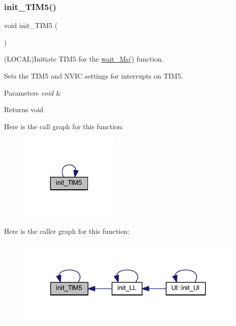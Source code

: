 \subsubsection{\texorpdfstring{init\+\_\+\+T\+I\+M5()}{init\_TIM5()}}
{\footnotesize\ttfamily void init\+\_\+\+T\+I\+M5 (\begin{DoxyParamCaption}\item[{void}]{ }\end{DoxyParamCaption})}



(L\+O\+C\+AL)Initiate T\+I\+M5 for the \mbox{\hyperlink{namespace_l_l_ab30bdedb41438098df71bea7d5eb624d}{wait\+\_\+\+Ms()}} function. 

Sets the T\+I\+M5 and N\+V\+IC settings for interrupts on T\+I\+M5.


\begin{DoxyParams}{Parameters}
{\em void} & \\
\hline
\end{DoxyParams}
\begin{DoxyReturn}{Returns}
void 
\end{DoxyReturn}
Here is the call graph for this function\+:\nopagebreak
\begin{figure}[H]
\begin{center}
\leavevmode
\includegraphics[width=136pt]{namespace_l_l_a559eb54e37dc62032e9774315c2b4638_cgraph}
\end{center}
\end{figure}
Here is the caller graph for this function\+:\nopagebreak
\begin{figure}[H]
\begin{center}
\leavevmode
\includegraphics[width=312pt]{namespace_l_l_a559eb54e37dc62032e9774315c2b4638_icgraph}
\end{center}
\end{figure}
\mbox{\label{namespace_l_l_a487e020844f801061abc930461b1ff2b}} 
